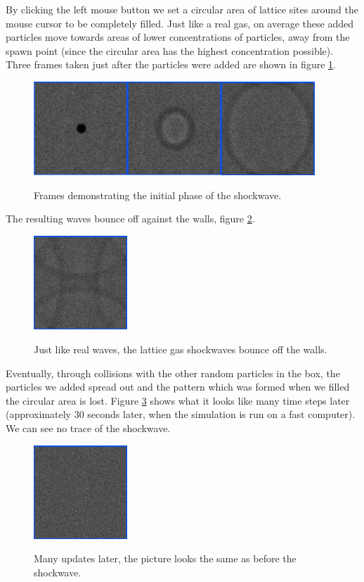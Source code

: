 \documentclass[12pt,a4paper]{article}
\begin{document}
By clicking the left mouse button we set a circular area of lattice sites around the mouse cursor to
be completely filled. Just like a real gas, on average these added particles move towards areas of lower
concentrations of particles, away from the spawn point (since the circular area has the highest concentration
possible). Three frames taken just after the particles were added are shown in figure \ref{hexwavestart}.

\begin{figure}[htp]
\caption{Frames demonstrating the initial phase of the shockwave.}
\centering
  \includegraphics[width=300pt]{figs/hexwavestart.png}
\label{hexwavestart}
\end{figure}


The resulting waves bounce off against the walls, figure \ref{hexwavebounce}.
\begin{figure}[htp]
\caption{Just like real waves, the lattice gas shockwaves bounce off the walls.}
\centering
  \includegraphics[width=100pt]{figs/hexwavebounce.png}
\label{hexwavebounce}
\end{figure}

Eventually, through collisions
with the other random particles in the box, the particles we added spread out and the pattern which was formed
when we filled the circular area is lost. Figure \ref{hexwaveend} shows what it looks like many time
steps later (approximately 30 seconds later, when the simulation is run on a fast computer).
We can see no trace of the shockwave.

\begin{figure}[htp]
\caption{Many updates later, the picture looks the same as before the shockwave.}
\centering
  \includegraphics[width=100pt]{figs/hexwaveend.png}
\label{hexwaveend}
\end{figure}
\end{document}
